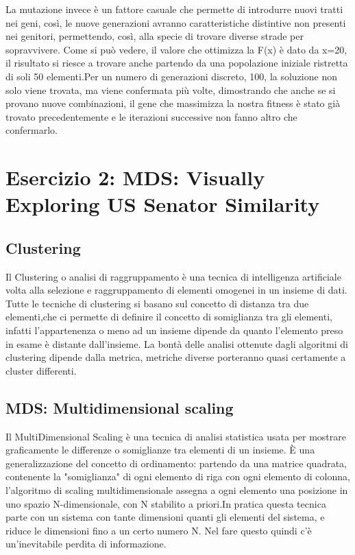 			La mutazione invece è un fattore casuale che permette di introdurre nuovi tratti nei geni, così, le nuove generazioni avranno caratteristiche distintive non presenti nei genitori, permettendo, così, alla specie di trovare diverse strade per sopravvivere.
			Come si può vedere, il valore che ottimizza la F(x) è dato da x=20, il risultato si riesce a trovare anche partendo da una popolazione iniziale ristretta di soli 50 elementi.Per un numero di generazioni discreto, 100, la soluzione non solo viene trovata, ma viene confermata più volte, dimostrando che anche se si provano nuove combinazioni, il gene che massimizza la nostra fitness è stato già trovato precedentemente e le iterazioni successive non fanno altro che confermarlo.
	\section{Esercizio 2: MDS: Visually Exploring US Senator Similarity}
		\label{sec:es2}
			\subsection{Clustering}
				Il Clustering o analisi di raggruppamento è una tecnica di intelligenza artificiale volta alla selezione e raggruppamento di elementi omogenei in un insieme di dati. Tutte le tecniche di clustering si basano sul concetto di distanza tra due elementi,che ci permette di definire il concetto di somiglianza tra gli elementi, infatti l'appartenenza o meno ad un insieme dipende da quanto l'elemento preso in esame è distante dall'insieme. La bontà delle analisi ottenute dagli algoritmi di clustering dipende dalla metrica, metriche diverse porteranno quasi certamente a cluster differenti.
				
			\subsection{MDS: Multidimensional scaling}
				Il MultiDimensional Scaling è una tecnica di analisi statistica usata per mostrare graficamente le differenze o somiglianze tra elementi di un insieme.   È una generalizzazione del concetto di ordinamento: partendo da una matrice quadrata, contenente la "somiglianza" di ogni elemento di riga con ogni elemento di colonna, l'algoritmo di scaling multidimensionale assegna a ogni elemento una posizione in uno spazio N-dimensionale, con N stabilito a priori.In pratica questa tecnica parte con un sistema con tante dimensioni quanti gli elementi del sistema, e riduce le dimensioni fino a un certo numero N. Nel fare questo quindi c'è un'inevitabile perdita di informazione.
